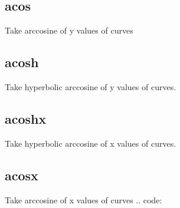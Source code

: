 \documentclass[letterpaper,10pt,english]{sphinxmanual}
\begin{document}
\subsection{acos}
\label{\detokenize{math_operations:acos}}
Take arccosine of y values of curves

\begin{sphinxVerbatim}[commandchars=\\\{\}]
\PYG{p}{[}\PYG{p}{]}  
\end{sphinxVerbatim}


\subsection{acosh}
\label{\detokenize{math_operations:acosh}}
Take hyperbolic arccosine of y values of curves.

\begin{sphinxVerbatim}[commandchars=\\\{\}]
\PYG{p}{[}\PYG{p}{]}  
\end{sphinxVerbatim}


\subsection{acoshx}
\label{\detokenize{math_operations:acoshx}}
Take hyperbolic arccosine of x values of curves.

\begin{sphinxVerbatim}[commandchars=\\\{\}]
\PYG{p}{[}\PYG{p}{]}  
\end{sphinxVerbatim}


\subsection{acosx}
\label{\detokenize{math_operations:acosx}}
Take arccosine of x values of curves
.. code:

\begin{sphinxVerbatim}[commandchars=\\\{\}]
\PYG{p}{[}\PYG{p}{]}  
\end{sphinxVerbatim}
\end{document}
